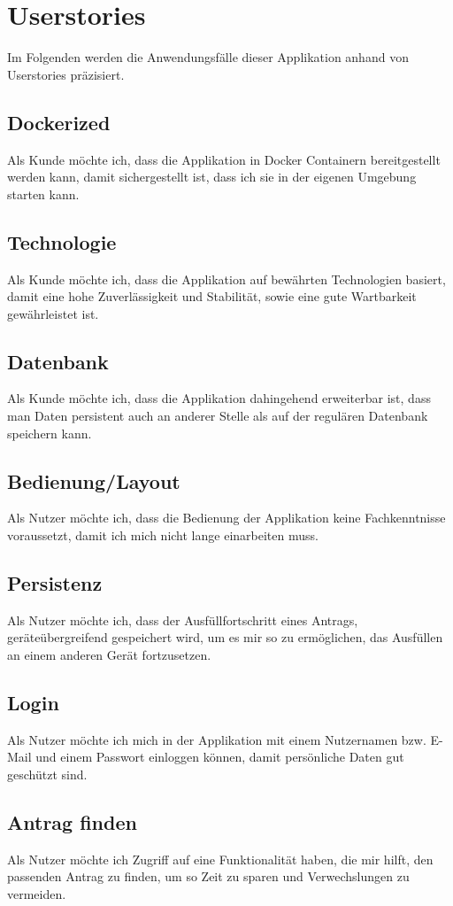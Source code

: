 \chapter{Userstories}\label{ch:userstories}
Im Folgenden werden die Anwendungsfälle dieser Applikation anhand von Userstories präzisiert.
\section{Dockerized}
Als Kunde möchte ich, dass die Applikation in Docker Containern bereitgestellt werden kann, damit 
sichergestellt ist, dass ich sie in der eigenen Umgebung starten kann.

\section{Technologie}
Als Kunde möchte ich, dass die Applikation auf bewährten Technologien basiert, damit eine hohe
Zuverlässigkeit und Stabilität, sowie eine gute Wartbarkeit gewährleistet ist.
\section{Datenbank}
Als Kunde möchte ich, dass die Applikation dahingehend erweiterbar ist, dass man Daten persistent 
auch an anderer Stelle als auf der regulären Datenbank speichern kann.
\section{Bedienung/Layout}
Als Nutzer möchte ich, dass die Bedienung der Applikation keine Fachkenntnisse voraussetzt, damit 
ich mich nicht lange einarbeiten muss.
\section{Persistenz}
Als Nutzer möchte ich, dass der Ausfüllfortschritt eines Antrags, geräteübergreifend gespeichert wird,
um es mir so zu ermöglichen, das Ausfüllen an einem anderen Gerät fortzusetzen.
\section{Login}
Als Nutzer möchte ich mich in der Applikation mit einem Nutzernamen bzw. E-Mail und einem Passwort
einloggen können, damit persönliche Daten gut geschützt sind.
\section{Antrag finden}
Als Nutzer möchte ich Zugriff auf eine Funktionalität haben, die mir hilft, den passenden 
Antrag zu finden, um so Zeit zu sparen und Verwechslungen zu vermeiden.
